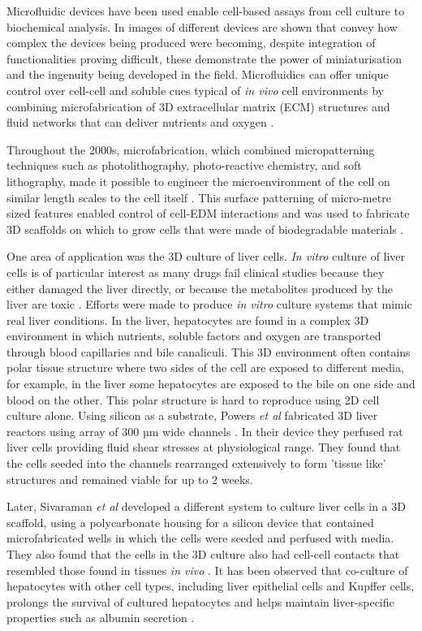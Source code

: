 Microfluidic devices have been used enable cell-based assays from cell culture to biochemical analysis. In
 images of different devices are shown that convey how complex the devices being
produced were becoming, despite integration of functionalities proving difficult, these demonstrate the
power of miniaturisation and the ingenuity being developed in the field.
Microfluidics can offer unique control over cell-cell and soluble cues typical of
\textit{in vivo} cell environments by combining microfabrication of 3D extracellular matrix (ECM)
structures and fluid networks that can deliver nutrients and oxygen \citep{folch1999molding}.

Throughout the 2000s, microfabrication, which combined micropatterning techniques such as
photolithography, photo-reactive chemistry, and soft lithography, made it possible to engineer the
microenvironment of the cell on similar length scales to the cell itself \citep{folch2000microengineering}. This surface
patterning of micro-metre sized features enabled control of cell-EDM interactions and was used
to fabricate 3D scaffolds on which to grow cells that were made of biodegradable
materials \citep{tsang2004three}.

One area of application was the 3D culture of liver cells. \textit{In vitro} culture
of liver cells is of particular interest as many drugs fail clinical studies because they
either damaged the liver directly, or because the metabolites produced by the liver are toxic
\citep{sivaraman2005microscale}. Efforts were made to produce \textit{in vitro} culture
systems that mimic real liver conditions. In the liver, hepatocytes are found in a complex
3D environment in which nutrients, soluble factors and oxygen are transported through blood
capillaries and bile canaliculi. This 3D environment often contains polar tissue structure
where two sides of the cell are exposed to different media, for example, in the liver
some hepatocytes are exposed to the bile on one side and blood on the other. This polar structure
is hard to reproduce using 2D cell culture alone. Using silicon as a substrate, Powers \textit{et al} fabricated
3D liver reactors using array of 300 µm wide channels \citep{powers2002microfabricated}. In their
device they perfused rat liver cells providing fluid shear stresses at physiological range. They found
that the cells seeded into the channels rearranged extensively to form 'tissue like' structures and
remained viable for up to 2 weeks.

Later, Sivaraman \textit{et al} developed a different system to culture liver cells in a 3D scaffold,
using a polycarbonate housing for a silicon device that contained microfabricated wells in which the
cells were seeded and perfused with media. They also found that the cells in the 3D culture
also had cell-cell contacts that resembled those found in tissues \textit{in
vivo} \citep{sivaraman2005microscale}. It has been observed that co-culture of hepatocytes with other cell types,
including liver epithelial cells and Kupffer cells, prolongs the survival of cultured hepatocytes and helps maintain
liver-specific properties such as albumin secretion \citep{guguen1983maintenance}.

